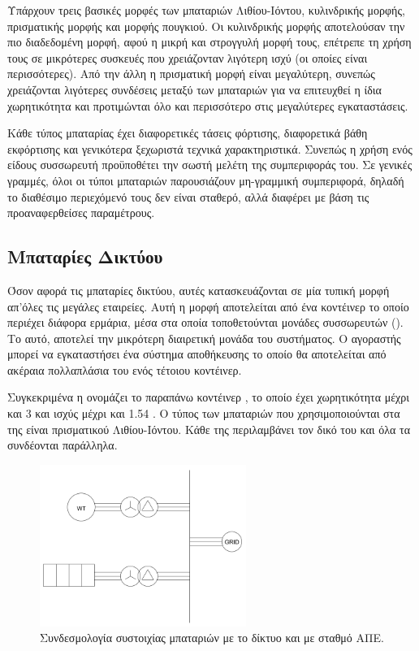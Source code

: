 \documentclass[12pt]{report}
\begin{document}
Υπάρχουν τρεις βασικές μορφές των μπαταριών Λιθίου-Ιόντου, κυλινδρικής μορφής, πρισματικής μορφής και μορφής πουγκιού. Οι κυλινδρικής μορφής αποτελούσαν την πιο διαδεδομένη μορφή, αφού η μικρή και στρογγυλή μορφή τους, 
επέτρεπε τη χρήση τους σε μικρότερες συσκευές που χρειάζονταν λιγότερη ισχύ (οι οποίες είναι περισσότερες). Από την άλλη η πρισματική μορφή είναι μεγαλύτερη, συνεπώς χρειάζονται λιγότερες συνδέσεις μεταξύ των μπαταριών 
για να επιτευχθεί η ίδια χωρητικότητα και προτιμώνται όλο και περισσότερο στις μεγαλύτερες εγκαταστάσεις.

Κάθε τύπος μπαταρίας έχει διαφορετικές τάσεις φόρτισης, διαφορετικά βάθη εκφόρτισης και γενικότερα ξεχωριστά τεχνικά χαρακτηριστικά. Συνεπώς η χρήση ενός είδους συσσωρευτή προϋποθέτει την σωστή μελέτη της συμπεριφοράς του.
Σε γενικές γραμμές, όλοι οι τύποι μπαταριών παρουσιάζουν μη-γραμμική συμπεριφορά, δηλαδή το διαθέσιμο περιεχόμενό τους δεν είναι σταθερό, αλλά διαφέρει με βάση τις προαναφερθείσες παραμέτρους.

\subsection{Μπαταρίες Δικτύου}
Όσον αφορά τις μπαταρίες δικτύου, αυτές κατασκευάζονται σε μία τυπική μορφή απ'όλες τις μεγάλες εταιρείες. Αυτή η μορφή αποτελείται από ένα κοντέινερ το οποίο περιέχει διάφορα ερμάρια, μέσα στα οποία τοποθετούνται
μονάδες συσσωρευτών ({}). Το {} αυτό, αποτελεί την μικρότερη διαιρετική μονάδα του συστήματος. Ο αγοραστής μπορεί να εγκαταστήσει ένα
σύστημα αποθήκευσης το οποίο θα αποτελείται από ακέραια πολλαπλάσια του ενός τέτοιου κοντέινερ. 

Συγκεκριμένα η {} ονομάζει το παραπάνω κοντέινερ {}, το οποίο έχει χωρητικότητα μέχρι και 3 {} και ισχύς μέχρι και 1.54 {}. Ο τύπος των μπαταριών που χρησιμοποιούνται
στα {} της είναι πρισματικού Λιθίου-Ιόντου. Κάθε {} της {} περιλαμβάνει τον δικό του {} και όλα τα {} συνδέονται παράλληλα. 

\begin{figure}[h]
				\center
				\includegraphics[width=0.6\textwidth]{gridbat}
				\captionsetup{width=0.8\textwidth}
				\caption{Συνδεσμολογία συστοιχίας μπαταριών με το δίκτυο και με σταθμό ΑΠΕ.}
				\label{fig:gridbat}
\end{figure}
\end{document}
